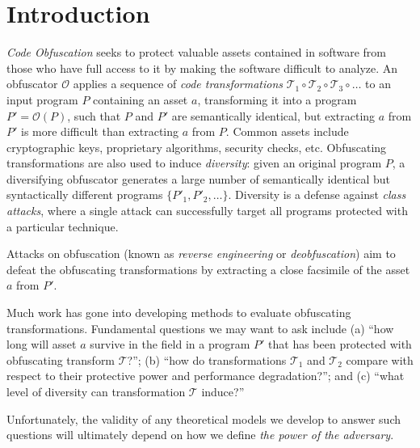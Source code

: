 
\section{Introduction}
 \textit{Code Obfuscation} seeks to protect valuable assets contained in software from those who have full access to it by making the software difficult to analyze. An obfuscator $\mathcal{O}$ applies a sequence of \textit{code transformations} $\mathcal{T}_1 \circ \mathcal{ T}_2 \circ \mathcal{ T}_3 \circ\ldots$ to an input program $P$ containing an asset $a$, transforming it into a program $P'=\mathcal{O}(P)$, such that $P$ and $P'$ are semantically identical, but extracting $a$ from $P'$ is more difficult than extracting $a$ from $P$. Common assets include cryptographic keys, proprietary algorithms, security checks, etc. Obfuscating transformations are also used to induce {\em diversity}: given an original program $P$, a diversifying obfuscator generates a large number of semantically identical but syntactically different programs $\{P'_1, P'_2,\ldots\}$. Diversity is a defense against {\em class attacks}, where a single attack can successfully target all programs protected with a particular technique.

Attacks on obfuscation (known as \textit{reverse engineering} or \textit{deobfuscation}) aim to defeat the obfuscating transformations by extracting a close facsimile of the asset $a$ from $P'$.

Much work has gone into developing methods to evaluate obfuscating transformations. Fundamental questions we may want to ask include (a) ``how long will asset $a$ survive in the field in a program $P'$ that has been protected with obfuscating transform $\mathcal{T}$?''; (b) ``how do transformations $\mathcal{T}_1$ and $\mathcal{T}_2$ compare with respect to their protective power and performance degradation?''; and (c) ``what level of diversity can transformation $\mathcal{T}$ induce?'' 

Unfortunately, the validity of any theoretical models we develop to answer such questions will ultimately depend on how we define {\em the power of the adversary}.


